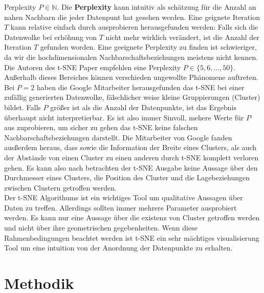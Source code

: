 \documentclass[12pt,letterpaper,ngerman]{article}
\begin{document}
Perplexity $P \in \mathbb{N}$. Die {\bf Perplexity} kann intuitiv als schätzung 
für die Anzahl an nahen Nachbarn die jeder Datenpunt hat gesehen werden.
Eine geignete Iteration $T$ kann relative einfach durch ausprobieren 
herausgefunden werden: Falls sich die Datenwolke bei erhöhung von $T$
nicht mehr wirklich verändert, ist die Anzahl der Iteration $T$ gefunden
worden. Eine geeignete Perplexity zu finden ist schwieriger, da wir die
hochdimensionalen Nachbarschaftsbeziehungen meistens nicht kennen. Die Autoren
des t-SNE Paper empfehlen eine Perplexity $P \in \{5,6, \dots, 50\}$. Außerhalb
dieses Bereiches können verschieden ungewollte Phänomene auftreten. Bei $P=2$
haben die Google Mitarbeiter herausgefunden das t-SNE bei einer zufällig generierten
Datenwolke, fälschlicher weise kleine Gruppierungen (Cluster) bildet. Falls
$P$ größer ist als die Anzahl der Datenpunkte, ist das Ergebnis überhaupt nicht
interpretierbar. Es ist also immer Sinvoll, mehere Werte für $P$ aus zuprobieren,
um sicher zu gehen das t-SNE keine falschen Nachbarschaftsbeziehungen darstellt.
Die Mitarbeiter von Google fanden ausßerdem heraus, dass sowie die Information 
der Breite eines Clusters, als auch der Abstände von einen Cluster zu einen anderen 
durch t-SNE komplett verloren gehen. Es kann also nach betrachten der
t-SNE Ausgabe keine Aussage über den Durchmesser eines Clusters, die Position
des Cluster und die Lagebeziehungen zwischen Clustern getroffen werden. \\
Der t-SNE Algorithums ist ein wichtiges Tool um qualitative Aussagen über 
Daten zu treffen. Allerdings sollten immer mehrere Parameter ausprobiert werden.
Es kann nur eine Aussage über die existenz von Cluster getroffen werden und 
nicht über ihre geometrischen gegebenheiten. Wenn diese Rahmenbedingungen 
beachtet werden ist t-SNE ein sehr mächtiges visualisierung Tool um eine 
intuition von der Anordnung der Datenpunkte zu erhalten.

\section{Methodik}
\end{document}
